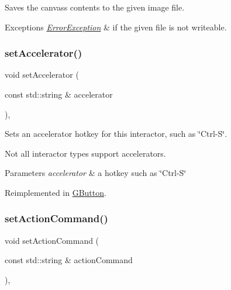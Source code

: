 Saves the canvas\textquotesingle{}s contents to the given image file. 


\begin{DoxyExceptions}{Exceptions}
{\em \mbox{\hyperlink{classErrorException}{Error\+Exception}}} & if the given file is not writeable. \\
\hline
\end{DoxyExceptions}
\mbox{\label{classGInteractor_ad15f102f62e2960576012f1aa0ba4b2e}} 
\subsubsection{\texorpdfstring{set\+Accelerator()}{setAccelerator()}}
{\footnotesize\ttfamily void set\+Accelerator (\begin{DoxyParamCaption}\item[{const std\+::string \&}]{accelerator }\end{DoxyParamCaption})\hspace{0.3cm}{\ttfamily [virtual]}, {\ttfamily [inherited]}}



Sets an accelerator hotkey for this interactor, such as \char`\"{}\+Ctrl-\/\+S\char`\"{}. 

Not all interactor types support accelerators. 
\begin{DoxyParams}{Parameters}
{\em accelerator} & a hotkey such as \char`\"{}\+Ctrl-\/\+S\char`\"{} \\
\hline
\end{DoxyParams}


Reimplemented in \mbox{\hyperlink{classGButton_a5f78fc506a33b57dced42a419be34446}{G\+Button}}.

\mbox{\label{classGInteractor_a4b5843fe3030e038a1ba54cc03389bcf}} 
\subsubsection{\texorpdfstring{set\+Action\+Command()}{setActionCommand()}}
{\footnotesize\ttfamily void set\+Action\+Command (\begin{DoxyParamCaption}\item[{const std\+::string \&}]{action\+Command }\end{DoxyParamCaption})\hspace{0.3cm}{\ttfamily [virtual]}, {\ttfamily [inherited]}}




